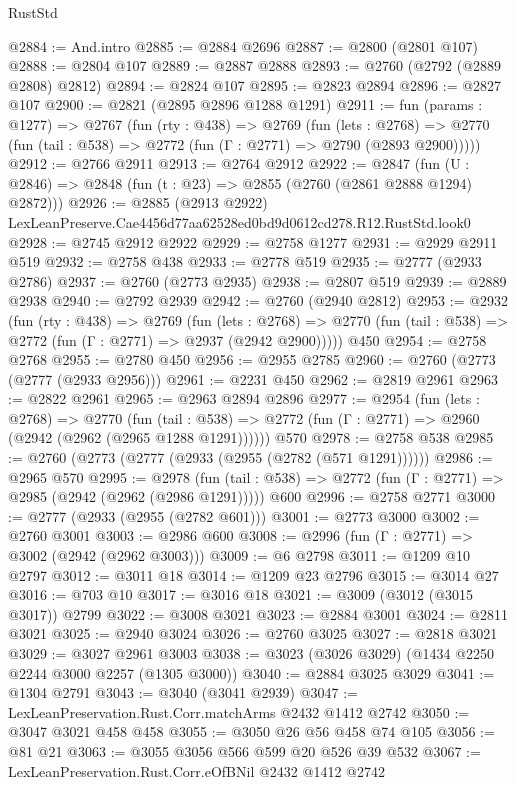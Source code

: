 \begin{lexlean}{RustStd}
\begin{coremodule}
@2884 := And.intro
@2885 := @2884 @2696
@2887 := @2800 (@2801 @107)
@2888 := @2804 @107
@2889 := @2887 @2888
@2893 := @2760 (@2792 (@2889 @2808) @2812)
@2894 := @2824 @107
@2895 := @2823 @2894
@2896 := @2827 @107
@2900 := @2821 (@2895 @2896 @1288 @1291)
@2911 := fun (params : @1277) =>
  @2767
    (fun (rty : @438) =>
    @2769
      (fun (lets : @2768) =>
      @2770 (fun (tail : @538) => @2772 (fun (Γ : @2771) => @2790 (@2893 @2900)))))
@2912 := @2766 @2911
@2913 := @2764 @2912
@2922 := @2847 (fun (U : @2846) => @2848 (fun (t : @23) => @2855 (@2760 (@2861 @2888 @1294) @2872)))
@2926 := @2885 (@2913 @2922) LexLeanPreserve.Cae4456d77aa62528ed0bd9d0612cd278.R12.RustStd.look0
@2928 := @2745 @2912 @2922
@2929 := @2758 @1277
@2931 := @2929 @2911 @519
@2932 := @2758 @438
@2933 := @2778 @519
@2935 := @2777 (@2933 @2786)
@2937 := @2760 (@2773 @2935)
@2938 := @2807 @519
@2939 := @2889 @2938
@2940 := @2792 @2939
@2942 := @2760 (@2940 @2812)
@2953 := @2932
    (fun (rty : @438) =>
    @2769
      (fun (lets : @2768) =>
      @2770 (fun (tail : @538) => @2772 (fun (Γ : @2771) => @2937 (@2942 @2900)))))
    @450
@2954 := @2758 @2768
@2955 := @2780 @450
@2956 := @2955 @2785
@2960 := @2760 (@2773 (@2777 (@2933 @2956)))
@2961 := @2231 @450
@2962 := @2819 @2961
@2963 := @2822 @2961
@2965 := @2963 @2894 @2896
@2977 := @2954
    (fun (lets : @2768) =>
    @2770
      (fun (tail : @538) => @2772 (fun (Γ : @2771) => @2960 (@2942 (@2962 (@2965 @1288 @1291))))))
    @570
@2978 := @2758 @538
@2985 := @2760 (@2773 (@2777 (@2933 (@2955 (@2782 (@571 @1291))))))
@2986 := @2965 @570
@2995 := @2978
    (fun (tail : @538) => @2772 (fun (Γ : @2771) => @2985 (@2942 (@2962 (@2986 @1291)))))
    @600
@2996 := @2758 @2771
@3000 := @2777 (@2933 (@2955 (@2782 @601)))
@3001 := @2773 @3000
@3002 := @2760 @3001
@3003 := @2986 @600
@3008 := @2996 (fun (Γ : @2771) => @3002 (@2942 (@2962 @3003)))
@3009 := @6 @2798
@3011 := @1209 @10 @2797
@3012 := @3011 @18
@3014 := @1209 @23 @2796
@3015 := @3014 @27
@3016 := @703 @10
@3017 := @3016 @18
@3021 := @3009 (@3012 (@3015 @3017)) @2799
@3022 := @3008 @3021
@3023 := @2884 @3001
@3024 := @2811 @3021
@3025 := @2940 @3024
@3026 := @2760 @3025
@3027 := @2818 @3021
@3029 := @3027 @2961 @3003
@3038 := @3023 (@3026 @3029) (@1434 @2250 @2244 @3000 @2257 (@1305 @3000))
@3040 := @2884 @3025 @3029
@3041 := @1304 @2791
@3043 := @3040 (@3041 @2939)
@3047 := LexLeanPreservation.Rust.Corr.matchArms @2432 @1412 @2742
@3050 := @3047 @3021 @458 @458
@3055 := @3050 @26 @56 @458 @74 @105
@3056 := @81 @21
@3063 := @3055 @3056 @566 @599 @20 @526 @39 @532
@3067 := LexLeanPreservation.Rust.Corr.eOfBNil @2432 @1412 @2742

\end{coremodule}
\end{lexlean}
